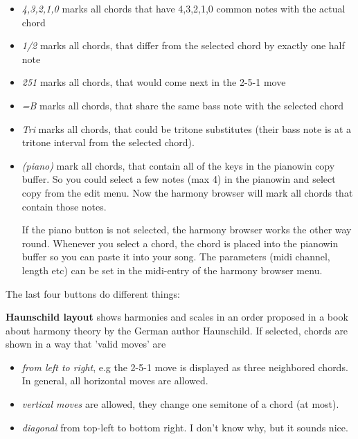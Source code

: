 \documentclass[letterpaper]{report}
\begin{document}
\begin{itemize}

\item {\em 4,3,2,1,0} marks all chords that have 4,3,2,1,0 common notes with the
actual chord

\item {\em 1/2} marks all chords, that differ from the selected chord by exactly
one half note

\item {\em 251} marks all chords, that would come next in the 2-5-1 move

\item {\em =B} marks all chords, that share the same bass note with the selected chord

\item {\em Tri} marks all chords, that could be tritone substitutes (their bass note
is at a tritone interval from the selected chord).

\item {\em (piano)} mark all chords, that contain all of the keys in the pianowin
copy buffer. So you could select a few notes (max 4) in the pianowin and select
copy from the edit menu. Now the harmony browser will mark all chords that contain
those notes.

If the piano button is not selected, the harmony browser works the other way round.
Whenever you select a chord, the chord is placed into the pianowin buffer so you
can paste it into your song. The parameters (midi channel, length etc) can be set
in the midi-entry of the harmony browser menu.

\end{itemize}

The last four buttons do different things:

{\bf Haunschild layout} shows harmonies and scales in an order proposed
in a book about harmony theory by the German author Haunschild. If selected,
chords are shown in a way that 'valid moves' are

\begin{itemize}
\item {\em from left to right}, e.g the 2-5-1 move is displayed as three neighbored
chords. In general, all horizontal moves are allowed.
\item {\em vertical moves} are allowed, they change one semitone of a chord (at most).
\item {\em diagonal} from top-left to bottom right. I don't know why, but it sounds
nice.
\end{itemize}
\end{document}
